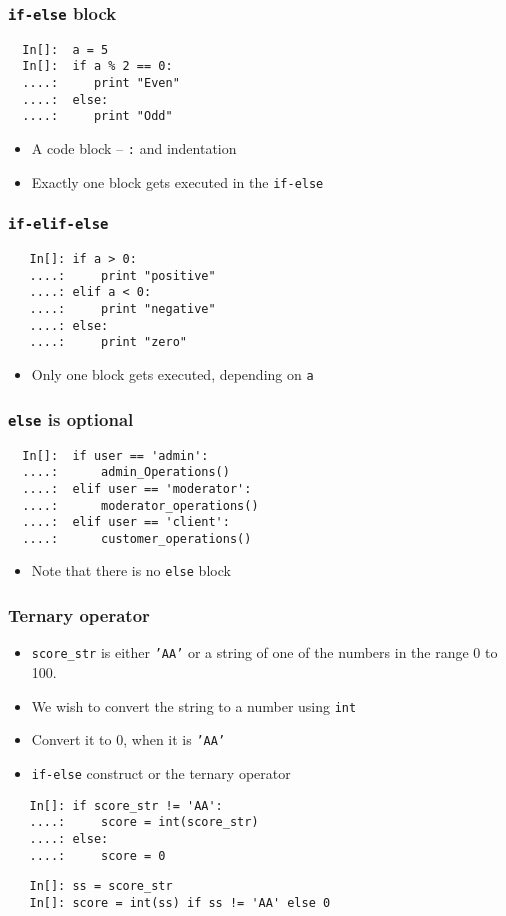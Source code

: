 \begin{frame}[fragile]
  \frametitle{\texttt{if-else} block}
  \begin{lstlisting}
  In[]:  a = 5
  In[]:  if a % 2 == 0:
  ....:     print "Even"
  ....:  else:
  ....:     print "Odd"
  \end{lstlisting}
  \begin{itemize}
  \item A code block -- \texttt{:} and indentation
  \item Exactly one block gets executed in the \texttt{if-else}
  \end{itemize}
\end{frame}


\begin{frame}[fragile]
  \frametitle{\texttt{if-elif-else}}
  \begin{lstlisting}
   In[]: if a > 0:           
   ....:     print "positive"
   ....: elif a < 0:         
   ....:     print "negative"
   ....: else:               
   ....:     print "zero"    
  \end{lstlisting}
  \begin{itemize}
  \item Only one block gets executed, depending on \texttt{a}
  \end{itemize}
\end{frame}

\begin{frame}[fragile]
  \frametitle{\texttt{else} is optional}
  \begin{lstlisting}
  In[]:  if user == 'admin':         
  ....:      admin_Operations()
  ....:  elif user == 'moderator':   
  ....:      moderator_operations()
  ....:  elif user == 'client':      
  ....:      customer_operations()
  \end{lstlisting}
  \begin{itemize}
  \item Note that there is no \texttt{else} block
  \end{itemize}
\end{frame}

\begin{frame}[fragile]
  \frametitle{Ternary operator}
  \begin{itemize}
  \item \texttt{score\_str} is either \texttt{'AA'} or a string of one
    of the numbers in the range 0 to 100. 
  \item We wish to convert the string to a number using \texttt{int}
  \item Convert it to 0, when it is \texttt{'AA'}
  \item \texttt{if-else} construct or the ternary operator
  \end{itemize}
  \begin{lstlisting}
   In[]: if score_str != 'AA':
   ....:     score = int(score_str)
   ....: else:
   ....:     score = 0
  \end{lstlisting}
  \begin{lstlisting}
   In[]: ss = score_str
   In[]: score = int(ss) if ss != 'AA' else 0
  \end{lstlisting}
\end{frame}


